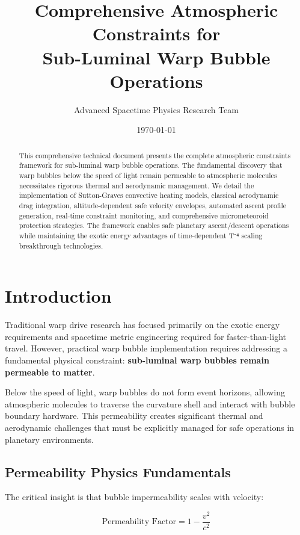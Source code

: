 \documentclass[12pt,a4paper]{article}
\title{Comprehensive Atmospheric Constraints for\\Sub-Luminal Warp Bubble Operations}
\author{Advanced Spacetime Physics Research Team}
\date{\today}
\begin{document}
\maketitle

\begin{abstract}
This comprehensive technical document presents the complete atmospheric constraints framework for sub-luminal warp bubble operations. The fundamental discovery that warp bubbles below the speed of light remain permeable to atmospheric molecules necessitates rigorous thermal and aerodynamic management. We detail the implementation of Sutton-Graves convective heating models, classical aerodynamic drag integration, altitude-dependent safe velocity envelopes, automated ascent profile generation, real-time constraint monitoring, and comprehensive micrometeoroid protection strategies. The framework enables safe planetary ascent/descent operations while maintaining the exotic energy advantages of time-dependent T⁻⁴ scaling breakthrough technologies.
\end{abstract}

\section{Introduction}

Traditional warp drive research has focused primarily on the exotic energy requirements and spacetime metric engineering required for faster-than-light travel. However, practical warp bubble implementation requires addressing a fundamental physical constraint: \textbf{sub-luminal warp bubbles remain permeable to matter}.

Below the speed of light, warp bubbles do not form event horizons, allowing atmospheric molecules to traverse the curvature shell and interact with bubble boundary hardware. This permeability creates significant thermal and aerodynamic challenges that must be explicitly managed for safe operations in planetary environments.

\subsection{Permeability Physics Fundamentals}

The critical insight is that bubble impermeability scales with velocity:

\begin{equation}
\text{Permeability Factor} = 1 - \frac{v^2}{c^2}
\end{equation}
\end{document}
